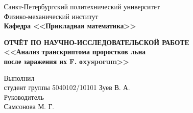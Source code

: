 \documentclass[main.tex]{subfiles}
\begin{document}
\begin{titlepage}
\begin{center}
	\begin{large}
		Санкт-Петербургский политехнический университет\\
		Физико-механический институт\\
		\textbf{Кафедра <<Прикладная математика>>}\\
	\end{large}
	\vfill
	\large{\textbf{ОТЧЁТ ПО НАУЧНО-ИССЛЕДОВАТЕЛЬСКОЙ РАБОТЕ\\
	<<Анализ транскриптома проростков льна\\
     после заражения их F. оxysporum>>}} \normalsize
\end{center}
\vfill
\flushleft
Выполнил\\
студент группы 5040102/10101
\flushright
Зуев В. А.\\
\flushleft
Руководитель\\
\flushright
Самсонова М. Г.
\flushleft
\vfill
{}
\end{titlepage}
\end{document}
